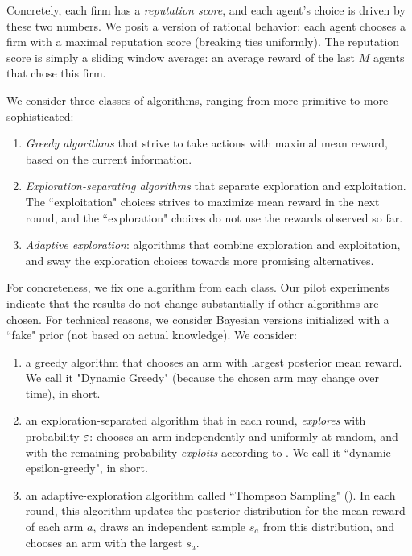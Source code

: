 \documentclass[../competing_bandits.tex]{subfiles}
\begin{document}
Concretely, each firm has a \emph{reputation score}, and each agent's choice is driven by these two numbers. We posit a version of rational behavior: each agent chooses a firm with a maximal reputation score (breaking ties uniformly). The reputation score is simply a sliding window average: an average reward of the last $M$ agents that chose this firm.

 We consider three classes of algorithms, ranging from more primitive to more sophisticated:

\begin{enumerate}
\item \emph{Greedy algorithms} that strive to take actions with maximal mean reward, based on the current information.

\item \emph{Exploration-separating algorithms} that separate exploration and exploitation. The ``exploitation" choices strives to maximize mean reward in the next round, and the ``exploration" choices do not use the rewards observed so far.
\item \emph{Adaptive exploration}: algorithms that combine exploration and exploitation, and sway the exploration choices towards more promising alternatives.
\end{enumerate}

For concreteness, we fix one algorithm from each class. Our pilot experiments indicate that the results do not change substantially if other algorithms are chosen.  For technical reasons, we consider Bayesian versions initialized with a ``fake" prior (\ie not based on actual knowledge). We consider:

\begin{enumerate}
\item a greedy algorithm that chooses an arm with largest posterior mean reward. We call it "Dynamic Greedy" (because the chosen arm may change over time), \DG in short.

\item an exploration-separated algorithm that in each round, \emph{explores} with probability $\varepsilon$: chooses an arm independently and uniformly at random, and with the remaining probability \emph{exploits} according to \DG. We call it ``dynamic epsilon-greedy", \DEG in short.

\item an adaptive-exploration algorithm called ``Thompson Sampling" (\TS). In each round, this algorithm updates the posterior distribution for the mean reward of each arm $a$, draws an independent sample $s_a$ from this distribution, and chooses an arm with the largest $s_a$.
\end{enumerate}
\end{document}
